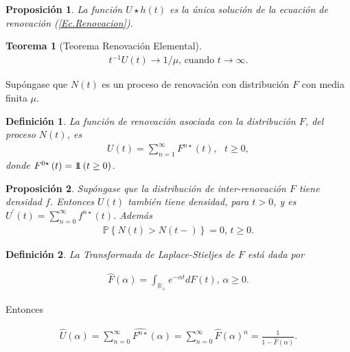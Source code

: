\documentclass{article}
\newtheorem{Def}{Definición}
\newtheorem{Teo}{Teorema}
\newtheorem{Prop}{Proposición}
\newcommand{\rea}{\mathbb{R}}
\newcommand{\prob}{\mathbb{P}}
\newcommand{\indora}{\mbox{$1$\hspace{-0.8ex}$1$}}
\begin{document}
\begin{Prop}
La funci\'on $U\star h\left(t\right)$ es la \'unica soluci\'on de la ecuaci\'on de renovaci\'on (\ref{Ec.Renovacion}).
\end{Prop}

\begin{Teo}[Teorema Renovaci\'on Elemental]
\begin{eqnarray*}
t^{-1}U\left(t\right)\rightarrow 1/\mu\textrm{,    cuando }t\rightarrow\infty.
\end{eqnarray*}
\end{Teo}



Sup\'ongase que $N\left(t\right)$ es un proceso de renovaci\'on con distribuci\'on $F$ con media finita $\mu$.

\begin{Def}
La funci\'on de renovaci\'on asociada con la distribuci\'on $F$, del proceso $N\left(t\right)$, es
\begin{eqnarray*}
U\left(t\right)=\sum_{n=1}^{\infty}F^{n\star}\left(t\right),\textrm{   }t\geq0,
\end{eqnarray*}
donde $F^{0\star}\left(t\right)=\indora\left(t\geq0\right)$.
\end{Def}


\begin{Prop}
Sup\'ongase que la distribuci\'on de inter-renovaci\'on $F$ tiene densidad $f$. Entonces $U\left(t\right)$ tambi\'en tiene densidad, para $t>0$, y es $U^{'}\left(t\right)=\sum_{n=0}^{\infty}f^{n\star}\left(t\right)$. Adem\'as
\begin{eqnarray*}
\prob\left\{N\left(t\right)>N\left(t-\right)\right\}=0\textrm{,   }t\geq0.
\end{eqnarray*}
\end{Prop}

\begin{Def}
La Transformada de Laplace-Stieljes de $F$ est\'a dada por

\begin{eqnarray*}
\hat{F}\left(\alpha\right)=\int_{\rea_{+}}e^{-\alpha t}dF\left(t\right)\textrm{,  }\alpha\geq0.
\end{eqnarray*}
\end{Def}

Entonces

\begin{eqnarray*}
\hat{U}\left(\alpha\right)=\sum_{n=0}^{\infty}\hat{F^{n\star}}\left(\alpha\right)=\sum_{n=0}^{\infty}\hat{F}\left(\alpha\right)^{n}=\frac{1}{1-\hat{F}\left(\alpha\right)}.
\end{eqnarray*}
\end{document}
